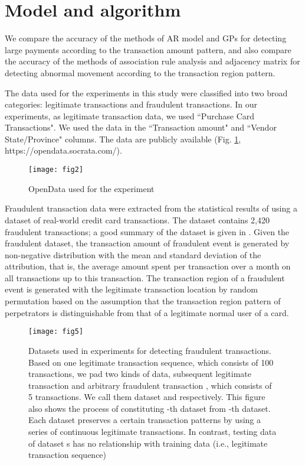 \documentclass[final,authoryear,5p,times,twocolumn]{elsarticle}
\begin{document}
\section{Model and algorithm}
\label{section:Sec4}
We compare the accuracy of the methods of AR model \citep{ref18} and GPs \citep{Gaussian06} for detecting large payments according to the transaction amount pattern, and also compare the accuracy of the methods of association rule analysis \citep{ref16} and adjacency matrix \citep{ref19} for detecting abnormal movement according to the transaction region pattern.

The data used for the experiments in this study were classified into two broad categories: legitimate transactions and fraudulent transactions. In our experiments, as legitimate transaction data, we used ``Purchase Card Transactions". We used the data in the ``Transaction amount" and ``Vendor State/Province" columns. The data are publicly available (Fig. \ref{fig:F2}, https://opendata.socrata.com/).

\begin{figure}[h!]
\begin{center}
\texttt{[image: fig2]}
\caption{OpenData used for the experiment}
\label{fig:F2}
\end{center}
\end{figure}

Fraudulent transaction data were extracted from the statistical results of \citet{ref3} using a dataset of real-world credit card transactions. The dataset contains 2,420 fraudulent transactions; a good summary of the dataset is given in \citet[Table 4]{ref3}. Given the fraudulent dataset, the transaction amount of fraudulent event is generated by non-negative distribution with the mean and standard deviation of the attribution, that is, the average amount spent per transaction over a month on all transactions up to this transaction. The transaction region of a fraudulent event is generated with the legitimate transaction location by random permutation based on the assumption that the transaction region pattern of perpetrators is distinguishable from that of a legitimate normal user of a card.

\begin{figure}[h!]
\begin{center}
\texttt{[image: fig5]}
\caption{Datasets used in experiments for detecting fraudulent transactions. Based on one legitimate transaction sequence, which consists of 100 transactions, we pad two kinds of data, subsequent legitimate transaction  and arbitrary fraudulent transaction , which consists of 5 transactions. We call them dataset  and  respectively. This figure also shows the process of constituting -th dataset from -th dataset. Each dataset  preserves a certain transaction patterns by using a series of continuous legitimate transactions. In contrast, testing data of dataset s has no relationship with training data (i.e., legitimate transaction sequence)}
\label{fig:F3}
\end{center}
\end{figure}
\end{document}
